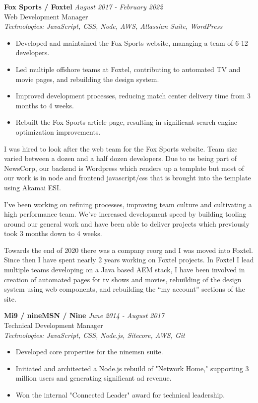 \documentclass[a4paper,10pt]{article}
\begin{document}
\textbf{Fox Sports / Foxtel} \hfill \textit{August 2017 - February 2022} \\
Web Development Manager \\
\textit{Technologies: JavaScript, CSS, Node, AWS, Atlassian Suite, WordPress}
\begin{itemize}
    \item Developed and maintained the Fox Sports website, managing a team of 6-12 developers.
    \item Led multiple offshore teams at Foxtel, contributing to automated TV and movie pages, and rebuilding the design system.
    \item Improved development processes, reducing match center delivery time from 3 months to 4 weeks.
    \item Rebuilt the Fox Sports article page, resulting in significant search engine optimization improvements.
\end{itemize}

I was hired to look after the web team for the Fox Sports website. Team size varied between a dozen and a half dozen developers. Due to us being part of NewsCorp, our backend is Wordpress which renders up a template but most of our work is in node and frontend javascript/css that is brought into the template using Akamai ESI.

I’ve been working on refining processes, improving team culture and cultivating a high performance team. We’ve increased development speed by building tooling around our general work and have been able to deliver projects which previously took 3 months down to 4 weeks.

Towards the end of 2020 there was a company reorg and I was moved into Foxtel. Since then I have spent nearly 2 years working on Foxtel projects. In Foxtel I lead multiple teams developing on a Java based AEM stack, I have been involved in creation of automated pages for tv shows and movies, rebuilding of the design system using web components, and rebuilding the “my account” sections of the site.

\vspace{1em}

\textbf{Mi9 / nineMSN / Nine} \hfill \textit{June 2014 - August 2017} \\
Technical Development Manager \\
\textit{Technologies: JavaScript, CSS, Node.js, Sitecore, AWS, Git}
\begin{itemize}
    \item Developed core properties for the ninemsn suite.
    \item Initiated and architected a Node.js rebuild of "Network Home," supporting 3 million users and generating significant ad revenue.
    \item Won the internal "Connected Leader" award for technical leadership.
\end{itemize}
\end{document}

